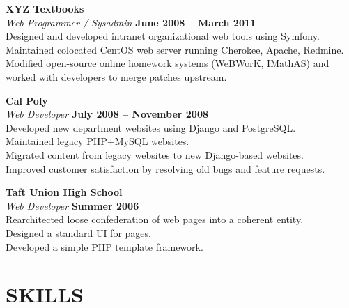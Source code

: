 \documentclass[margin,line]{resume}
\begin{document}
\begin{resume}
    \textbf{\listing XYZ Textbooks} \vspace{2mm}\\\vspace{1mm}%
    \textsl{Web Programmer / Sysadmin} \hfill \textbf{June 2008 -- March 2011}\\
    Designed and developed intranet organizational web tools using Symfony.\\
    Maintained colocated CentOS web server running Cherokee, Apache, Redmine.\\
    Modified open-source online homework systems (WeBWorK, IMathAS) and worked with developers to merge patches upstream.
    
    \textbf{\listing Cal Poly} \vspace{2mm}\\\vspace{1mm}%
    \textsl{Web Developer} \hfill \textbf{July 2008 -- November 2008}\\
    Developed new department websites using Django and PostgreSQL.\\
    Maintained legacy PHP+MySQL websites.\\
    Migrated content from legacy websites to new Django-based websites.\\
    Improved customer satisfaction by resolving old bugs and feature requests.

    \textbf{\listing Taft Union High School} \vspace{2mm}\\\vspace{1mm}%
    \textsl{Web Developer} \hfill \textbf{Summer 2006}\\
    Rearchitected loose confederation of web pages into a coherent entity.\\
    Designed a standard UI for pages.\\
    Developed a simple PHP template framework.

\sectionline

    \section{\mysidestyle \textbf{\large{S}\small{KILLS}}}


\end{resume}
\end{document}
